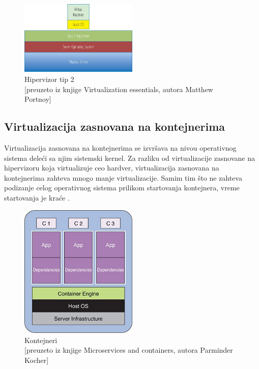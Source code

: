 \documentclass[12pt,oneside]{memoir}
\begin{document}
\begin{figure}[!ht]
  \centering
  \includegraphics[width=0.5\textwidth]{Slika 3.jpg}
  \caption{Hipervizor tip 2\\\footnotesize[preuzeto iz knjige Virtualization essentials, autora Matthew Portnoy]}
  \label{fig:hipervizorTip2}
\end{figure}

 
\subsection{Virtualizacija zasnovana na kontejnerima}

Virtualizacija zasnovana na kontejnerima se izvršava na nivou operativnog sistema deleći sa njim sistemski kernel. Za razliku od virtualizacije zasnovane na hipervizoru koja virtualizuje ceo hardver, virtualizacija zasnovana na kontejnerima zahteva mnogo manje virtualizacije. Samim tim što ne zahteva podizanje celog operativnog sistema prilikom startovanja kontejnera, vreme startovanja je kraće \cite{gswc}. 
 
\begin{figure}[!ht]
  \centering
  \includegraphics[width=0.5\textwidth]{Slika 4.jpg}
  \caption{Kontejneri\\\footnotesize[preuzeto iz knjige Microservices and containers, autora Parminder Kocher]}
  \label{fig:kontejneri}
\end{figure}
\end{document}
